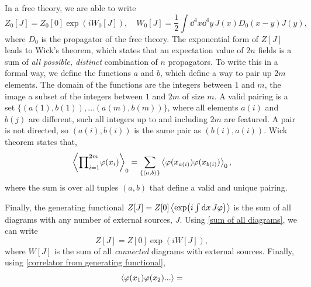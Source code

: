 In a free theory, we are able to write
\begin{equation}
    Z_0[J] = Z_0[0] \exp(i W_0[J]), \quad 
    W_0[J] = \frac{1}{2} \int \dd^4 x \dd^4 y \, J(x) D_0(x - y) J(y),
\end{equation}
where $D_0$ is the propagator of the free theory.
The exponential form of $Z[J]$ leads to Wick's theorem, which states that an expectation value of $2n$ fields is a sum of \emph{all possible, distinct} combination of $n$ propagators.
To write this in a formal way, we define the functions $a$ and $b$, which define a way to pair up $2m$ elements.
The domain of the functions are the integers between $1$ and $m$, the image a subset of the integers between $1$ and $2m$ of size $m$.
A valid pairing is a set $\{(a(1), b(1)), \dots (a(m), b(m))\}$, where all elements $a(i)$ and $b(j)$ are different, such all integers up to and including $2m$ are featured.
A pair is not directed, so $(a(i), b(i))$ is the same pair as $(b(i), a(i))$.
Wick theorem states that,
\begin{equation}
    \ex{{\prod}_{i=1}^{2m} \varphi(x_i)  }_0
    = \sum_{\{(a, b)\}} \ex{\varphi(x_{a(i)}) \varphi(x_{b(i)})}_0,
\end{equation}
where the sum is over all tuples $(a, b)$ that define a valid and unique pairing.

Finally, the generating functional $Z[J] = Z[0]\ex{\exp(i \int \dd x \, J \varphi)} $ is the sum of all diagrams with any number of external sources, $J$. 
Using \autoref{sum of all diagrams}, we can write
\begin{equation}
    Z[J] = Z[0] \exp(i W[J]),
\end{equation}
where $W[J]$ is the sum of all \emph{connected} diagrams with external sources.
Finally, using \autoref{correlator from generating functional}, 
\begin{equation}
    \ex{\varphi(x_1)\varphi(x_2)...}
    = 
\end{equation}

